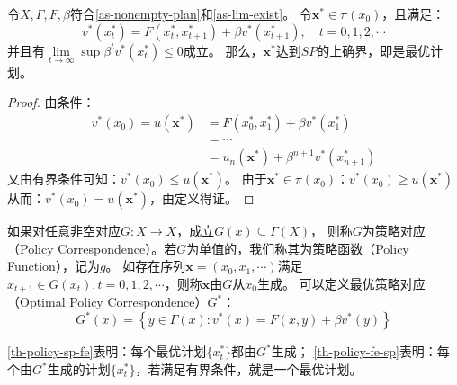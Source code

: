 \begin{theorem} \label{th-policy-fe-sp}
    令$X, \Gamma, F, \beta$符合\cref{as-nonempty-plan}和\cref{as-lim-exist}。
    令$\boldsymbol{x}^*\in \pi\left(x_0\right)$，且满足：
    \begin{equation*}
        v^*\left(x_t^*\right) = F\left(x_t^*,x_{t+1}^*\right) + \beta v^*\left(x_{t+1}^*\right), 
            \quad t=0,1,2,\cdots
    \end{equation*}
    并且有$\lim\limits_{t\rightarrow\infty}\sup\beta^t v^*\left(x_t^*\right)\leq 0$成立。
    那么，$\boldsymbol{x}^*$达到$SP$的上确界，即是最优计划。
\end{theorem}
\begin{proof}
    由条件：
    \begin{equation*}
        \begin{aligned}
            v^*\left(x_0\right) = u\left(\boldsymbol{x}^*\right)&= F\left(x_0^*,x_1^*\right)
                +\beta v^*\left(x_1^*\right) \\
            &= \cdots \\
            &= u_n\left(\boldsymbol{x}^*\right) + \beta^{n+1}v^*\left(x_{n+1}^*\right)
        \end{aligned}
    \end{equation*}
    又由有界条件可知：$v^*\left(x_0\right)\leq u\left(\boldsymbol{x}^*\right)$。
    由于$\boldsymbol{x}^*\in \pi\left(x_0\right)$：$v^*\left(x_0\right)\geq u\left(\boldsymbol{x}^*\right)$
    从而：$v^*\left(x_0\right) = u\left(\boldsymbol{x}^*\right)$，由定义得证。
\end{proof}

\begin{definition}
    如果对任意非空对应$G: X\rightarrow X$，成立$G\left(x\right)\subseteq \Gamma\left(X\right)$，
    则称$G$为策略对应（Policy Correspondence）。若$G$为单值的，我们称其为策略函数（Policy Function），记为$g$。
    如存在序列$\boldsymbol{x}=\left(x_0,x_1,\cdots\right)$满足
    $x_{t+1}\in G\left(x_t\right), t=0,1,2,\cdots$，则称$\boldsymbol{x}$由$G$从$x_0$生成。
    可以定义最优策略对应（Optimal Policy Correspondence）$G^*$：
    \begin{equation*}
        G^*(x)=\left\{y \in \Gamma(x): v^*(x)=F(x, y)+\beta v^*(y)\right\}
    \end{equation*}
\end{definition}

\cref{th-policy-sp-fe}表明：每个最优计划$\{x_t^*\}$都由$G^*$生成；
\cref{th-policy-fe-sp}表明：每个由$G^*$生成的计划$\{x_t^*\}$，若满足有界条件，就是一个最优计划。


